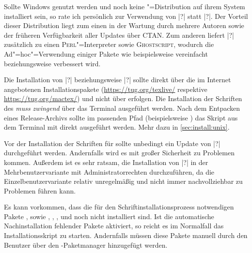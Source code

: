 

Sollte Windows genutzt werden und noch keine "=Distribution auf 
ihrem System installiert sein, so rate ich persönlich zur Verwendung von 
|?| statt |?|. 
Der Vorteil dieser Distribution liegt zum einen in der Wartung durch mehrere 
Autoren sowie der früheren Verfügbarkeit aller Updates über CTAN. Zum anderen 
liefert |?| zusätzlich zu  einen 
\textsc{Perl}"=Interpreter sowie \textsc{Ghostscript}, wodurch die 
Ad"=hoc"=Verwendung einiger Pakete wie beispielsweise  
vereinfacht beziehungsweise verbessert wird. 


Die Installation von |?| beziehungsweise 
|?| sollte direkt über die im Internet 
angebotenen Installationspakete (\url{https://tug.org/texlive/} respektive 
\url{https://tug.org/mactex/}) und nicht über  erfolgen. 
%
Die Installation der Schriften des \CDs \emph{muss zwingend} über das Terminal 
ausgeführt werden. Nach dem Entpacken eines Release-Archivs sollte im passenden 
Pfad (beispielsweise ) 
das Skript aus dem Terminal mit  direkt ausgeführt 
werden. Mehr dazu in \autoref{sec:install:unix}.


Vor der Installation der Schriften für \TUDScript sollte unbedingt ein Update 
von |?| durchgeführt werden. Andernfalls wird 
es mit großer Sicherheit zu Problemen kommen. Außerdem ist es sehr ratsam, die 
Installation von |?| in der Mehrbenutzervariante 
mit Administratorrechten durchzuführen, da die Einzelbenutzervariante relativ
unregelmäßig und nicht immer nachvollziehbar zu Problemen führen kann. 

Es kann vorkommen, dass die für den Schriftinstallationsprozess notwendigen 
Pakete ,  sowie , 
, ,  und  
noch nicht installiert sind. Ist die automatische Nachinstallation fehlender 
Pakete aktiviert, so reicht es im Normalfall das Installationsskript zu 
starten. Andernfalls müssen diese Pakete manuell durch den Benutzer über den 
-Paketmanager hinzugefügt werden.

